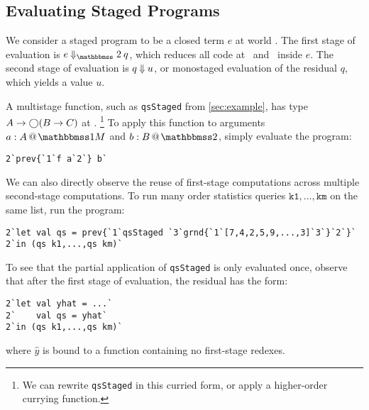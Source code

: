 

\subsection{Evaluating Staged Programs}

We consider a staged program to be a closed term $e$ at world \bbtwo. The first
stage of evaluation is $e\mathbin{\redtwosym} q$, which reduces all code at
\bbonem\ and \bbonep\ inside $e$. The second stage of evaluation is $q
\mathbin{{\Downarrow}} u$, or monostaged evaluation of the residual $q$, which yields
a value $u$.

A multistage function, such as \texttt{qsStaged} from \ref{sec:example}, has
type $A\to \bigcirc (B \to C)$ at \bbonem.%
\footnote{We can rewrite \texttt{qsStaged} in this curried form, or apply a
higher-order currying function.}
To apply this function to arguments $\colmix a A$ and $\coltwo b B$, simply
evaluate the program:
\begin{lstlisting}
2`prev{`1`f a`2`} b`
\end{lstlisting}

We can also directly observe the reuse of first-stage computations across
multiple second-stage computations. To run many order statistics queries
$\texttt{k1},\dots,\texttt{km}$ on the same list, run the program:
\begin{lstlisting}
2`let val qs = prev{`1`qsStaged `3`grnd{`1`[7,4,2,5,9,...,3]`3`}`2`}`
2`in (qs k1,...,qs km)`
\end{lstlisting}
To see that the partial application of \texttt{qsStaged} is only evaluated once,
observe that after the first stage of evaluation, the residual has the form:
\begin{lstlisting}
2`let val yhat = ...`
2`    val qs = yhat`
2`in (qs k1,...,qs km)`
\end{lstlisting}
where $\hat{y}$ is bound to a function containing no first-stage redexes.

